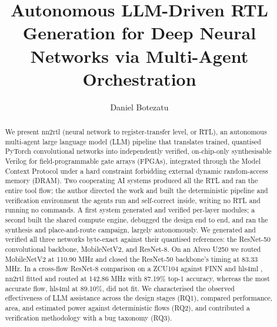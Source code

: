 \documentclass[acmtog,authorversion]{acmart}
\begin{document}
\title[Autonomous LLM-Driven RTL Generation for DNNs]{Autonomous LLM-Driven RTL Generation for Deep Neural Networks via Multi-Agent Orchestration}

\author{Daniel Botezatu}
\renewcommand{\shortauthors}{Botezatu}

\begin{abstract}
We present nn2rtl (neural network to register-transfer level, or RTL), an autonomous multi-agent large language model (LLM) pipeline that translates trained, quantised PyTorch convolutional networks \cite{paszke2019} into independently verified, on-chip-only synthesisable Verilog for field-programmable gate arrays (FPGAs), integrated through the Model Context Protocol \cite{anthropic2025mcp} under a hard constraint forbidding external dynamic random-access memory (DRAM). Two cooperating AI systems produced all the RTL and ran the entire tool flow; the author directed the work and built the deterministic pipeline and verification environment the agents run and self-correct inside, writing no RTL and running no commands. A first system generated and verified per-layer modules; a second built the shared compute engine, debugged the design end to end, and ran the synthesis and place-and-route campaign, largely autonomously. We generated and verified all three networks byte-exact against their quantised references: the ResNet-50 convolutional backbone, MobileNetV2, and ResNet-8. On an Alveo U250 we routed MobileNetV2 at 110.90 MHz and closed the ResNet-50 backbone's timing at 83.33 MHz. In a cross-flow ResNet-8 comparison on a ZCU104 against FINN \cite{umuroglu2017finn} and hls4ml \cite{schulte2026hls4ml}, nn2rtl fitted and routed at 142.86 MHz with 87.19\% top-1 accuracy, whereas the most accurate flow, hls4ml at 89.10\%, did not fit. We characterised the observed effectiveness of LLM assistance across the design stages (RQ1), compared performance, area, and estimated power against deterministic flows (RQ2), and contributed a verification methodology with a bug taxonomy (RQ3).
\end{abstract}


\maketitle
\end{document}
